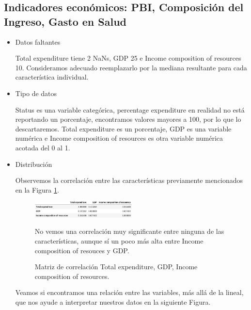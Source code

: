 \subsection{Indicadores económicos: PBI, Composición del Ingreso, Gasto en Salud}
    \begin{itemize}
        \item Datos faltantes
        
            Total expenditure tiene 2 NaNs, GDP 25 e Income composition of resources 10. Consideramos adecuado reemplazarlo por la mediana resultante para cada característica individual.
            
        \item Tipo de datos
        
            Status es una variable categórica, percentage expenditure en realidad no está reportando un porcentaje, encontramos valores mayores a 100, por lo que lo descartaremos.
            Total expenditure es un porcentaje, GDP es una variable numérica e Income composition of resources es otra variable numérica acotada del 0 al 1.  
            
        \item Distribución 
        
            Observemos la correlación entre las características previamente mencionados en la Figura \ref{fig: 6}.
            
              \begin{figure}[H]
            	\centering
            	\includegraphics[width=0.50\textwidth]{img/12.png}
            	\caption{Matriz de correlación Total expenditure, GDP, Income composition of resources.}
            	No vemos una correlación muy significante entre ninguna de las características, aunque sí un poco más alta entre Income composition of resouces y GDP.
            	\label{fig: 6}
            \end{figure}
            
            Veamos si encontramos una relación entre las variables, más allá de la lineal, que nos ayude a interpretar nuestros datos en la siguiente Figura. 
            

\end{itemize}
